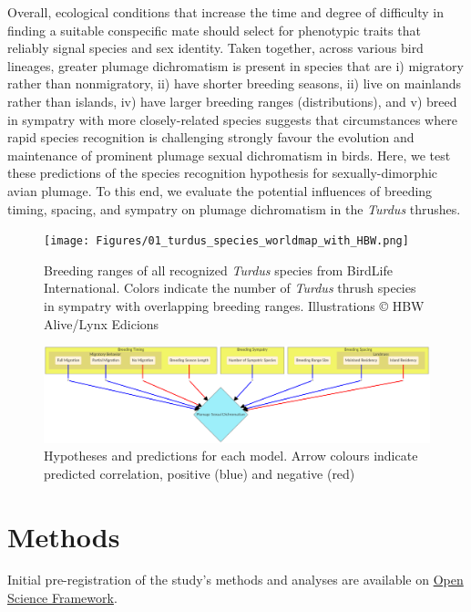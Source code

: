 \documentclass[
  a4paper,
]{article}
\begin{document}
Overall, ecological conditions that increase the time and degree of
difficulty in finding a suitable conspecific mate should select for
phenotypic traits that reliably signal species and sex identity. Taken
together, across various bird lineages, greater plumage dichromatism is
present in species that are i) migratory rather than nonmigratory, ii)
have shorter breeding seasons, ii) live on mainlands rather than
islands, iv) have larger breeding ranges (distributions), and v) breed
in sympatry with more closely-related species suggests that
circumstances where rapid species recognition is challenging strongly
favour the evolution and maintenance of prominent plumage sexual
dichromatism in birds. Here, we test these predictions of the species
recognition hypothesis for sexually-dimorphic avian plumage. To this
end, we evaluate the potential influences of breeding timing, spacing,
and sympatry on plumage dichromatism in the \emph{Turdus} thrushes.

\begin{figure}
\hypertarget{fig:fig-01-turdus-ranges}{%
\centering
\texttt{[image: Figures/01\_turdus\_species\_worldmap\_with\_HBW.png]}
\caption{Breeding ranges of all recognized \emph{Turdus} species from
BirdLife International. Colors indicate the number of \emph{Turdus}
thrush species in sympatry with overlapping breeding ranges.
Illustrations © HBW Alive/Lynx Edicions}\label{fig:fig-01-turdus-ranges}
}
\end{figure}

\begin{figure}
\hypertarget{fig:fig:02-hypotheses}{%
\centering
\includegraphics{Figures/hypothesis-figure-mermaid.png}
\caption{Hypotheses and predictions for each model. Arrow colours
indicate predicted correlation, positive (blue) and negative
(red)}\label{fig:fig:02-hypotheses}
}
\end{figure}

\hypertarget{methods}{%
\section{Methods}\label{methods}}

Initial pre-registration of the study's methods and analyses are
available on \href{https://osf.io/zum6d}{Open Science Framework}.
\end{document}
